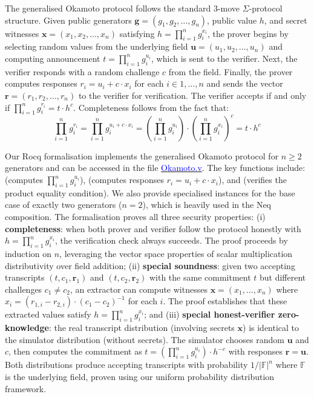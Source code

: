 \documentclass[sigconf,anonymous,review]{acmart}
\begin{document}
The generalised Okamoto protocol follows the standard 3-move $\Sigma$-protocol structure. Given public generators $\mathbf{g} = (g_1, g_2, \ldots, g_n)$, public value $h$, and secret witnesses $\mathbf{x} = (x_1, x_2, \ldots, x_n)$ satisfying $h = \prod_{i=1}^{n} g_i^{x_i}$, the prover begins by selecting random values from the underlying field $\mathbf{u} = (u_1, u_2, \ldots, u_n)$ and computing announcement $t = \prod_{i=1}^{n} g_i^{u_i}$, which is sent to the verifier. Next, the verifier responds with a random challenge $c$ from the field. Finally, the prover computes responses $r_i = u_i + c \cdot x_i$ for each $i \in {1, \ldots, n}$ and sends the vector $\mathbf{r} = (r_1, r_2, \ldots, r_n)$ to the verifier for verification. The verifier accepts if and only if 
$\prod_{i=1}^{n} g_i^{r_i} = t \cdot h^c$. Completeness follows from the fact that:
\[
\prod_{i=1}^{n} g_i^{r_i} = \prod_{i=1}^{n} g_i^{u_i + c \cdot x_i} = 
\left(\prod_{i=1}^{n} g_i^{u_i}\right) \cdot \left(\prod_{i=1}^{n} g_i^{x_i}\right)^c = t \cdot h^c
\]

Our Rocq formalisation implements the generalised Okamoto protocol for $n \geq 2$ generators and can be accessed in the file \href{https://anonymous.4open.science/r/SigmaProtocol-EBA5/src/Crypto/Okamoto.v}{\textcolor{blue}{Okamoto.v}}. The key functions include: \texttt{} (computes $\prod_{i=1}^{n} g_i^{u_i}$), \texttt{} (computes responses $r_i = u_i + c \cdot x_i$), and 
\texttt{} (verifies the product equality condition). We also provide specialised instances for the base case of exactly two generators ($n=2$), which is heavily used in the Neq composition. The formalisation proves all three security properties: (i) \textbf{completeness}: 
when both prover and verifier follow the protocol honestly with $h = \prod_{i=1}^{n} g_i^{x_i}$, 
the verification check always succeeds. The proof proceeds by induction on $n$, leveraging the 
vector space properties of scalar multiplication distributivity over field addition; (ii) \textbf{special soundness}: 
given two accepting transcripts $(t, c_1, \mathbf{r}_1)$ and $(t, c_2, \mathbf{r}_2)$ with 
the same commitment $t$ but different challenges $c_1 \neq c_2$, an extractor can compute 
witnesses $\mathbf{x} = (x_1, \ldots, x_n)$ where 
$x_i = (r_{1,i} - r_{2,i}) \cdot (c_1 - c_2)^{-1}$ for each $i$. The proof establishes that 
these extracted values satisfy $h = \prod_{i=1}^{n} g_i^{x_i}$; and (iii) \textbf{special honest-verifier zero-knowledge}: 
the real transcript distribution (involving secrets $\mathbf{x}$) is identical to the simulator 
distribution (without secrets). The simulator chooses random $\mathbf{u}$ and $c$, then computes 
the commitment as $t = \left(\prod_{i=1}^{n} g_i^{u_i}\right) \cdot h^{-c}$ with responses 
$\mathbf{r} = \mathbf{u}$. Both distributions produce accepting transcripts with probability 
$1/|\mathbb{F}|^n$ where $\mathbb{F}$ is the underlying field, proven using our uniform probability 
distribution framework.
\end{document}
